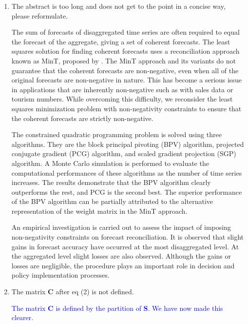 \documentclass[10pt,a4paper]{article}
\begin{document}
\begin{enumerate}
\item
  The abstract is too long and does not get to the point in a concise way, please reformulate.

  {\color{blue}
  The sum of forecasts of disaggregated time series are often required to equal the forecast of the aggregate, giving a set of coherent forecasts. The least squares solution for finding coherent forecasts uses a reconciliation approach known as MinT, proposed by \citet{Wick2018}. The MinT approach and its variants do not guarantee that the coherent forecasts are non-negative, even when all of the original forecasts are non-negative in nature. This has become a serious issue in applications that are inherently non-negative such as with sales data or tourism numbers. While overcoming this difficulty, we reconsider the least squares minimization problem with non-negativity constraints to ensure that the coherent forecasts are strictly non-negative.

  The constrained quadratic programming problem is solved using three algorithms. They are the block principal pivoting (BPV) algorithm, projected conjugate gradient (PCG) algorithm, and scaled gradient projection (SGP) algorithm. A Monte Carlo simulation is performed to evaluate the computational performances of these algorithms as the number of time series increases. The results demonstrate that the BPV algorithm clearly outperforms the rest, and PCG is the second best. The superior performance of the BPV algorithm can be partially attributed to the alternative representation of the weight matrix in the MinT approach.

  An empirical investigation is carried out to assess the impact of imposing non-negativity constraints on forecast reconciliation. It is observed that slight gains in forecast accuracy have occurred at the most disaggregated level. At the aggregated level slight losses are also observed. Although the gains or losses are negligible, the procedure plays an important role in decision and policy implementation processes.}

\item
  The matrix $\bm{C}$ after eq (2) is not defined.

  \textcolor{blue}{The matrix $\bm{C}$ is defined by the partition of $\bm{S}$. We have now made this clearer.}



\end{enumerate}
\end{document}
